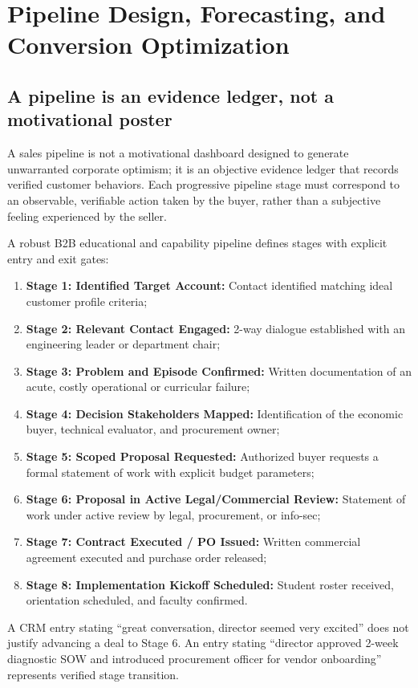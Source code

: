 \section{Pipeline Design, Forecasting, and Conversion Optimization}

\subsection{A pipeline is an evidence ledger, not a motivational poster}

A sales pipeline is not a motivational dashboard designed to generate unwarranted corporate optimism; it is an objective evidence ledger that records verified customer behaviors. Each progressive pipeline stage must correspond to an observable, verifiable action taken by the buyer, rather than a subjective feeling experienced by the seller.

A robust B2B educational and capability pipeline defines stages with explicit entry and exit gates:
\begin{enumerate}
\item \textbf{Stage 1: Identified Target Account:} Contact identified matching ideal customer profile criteria;
\item \textbf{Stage 2: Relevant Contact Engaged:} 2-way dialogue established with an engineering leader or department chair;
\item \textbf{Stage 3: Problem and Episode Confirmed:} Written documentation of an acute, costly operational or curricular failure;
\item \textbf{Stage 4: Decision Stakeholders Mapped:} Identification of the economic buyer, technical evaluator, and procurement owner;
\item \textbf{Stage 5: Scoped Proposal Requested:} Authorized buyer requests a formal statement of work with explicit budget parameters;
\item \textbf{Stage 6: Proposal in Active Legal/Commercial Review:} Statement of work under active review by legal, procurement, or info-sec;
\item \textbf{Stage 7: Contract Executed / PO Issued:} Written commercial agreement executed and purchase order released;
\item \textbf{Stage 8: Implementation Kickoff Scheduled:} Student roster received, orientation scheduled, and faculty confirmed.
\end{enumerate}
A CRM entry stating ``great conversation, director seemed very excited'' does not justify advancing a deal to Stage 6. An entry stating ``director approved 2-week diagnostic SOW and introduced procurement officer for vendor onboarding'' represents verified stage transition.

